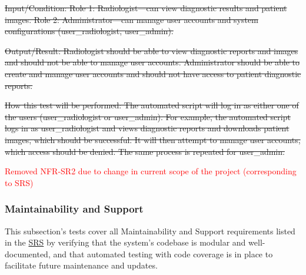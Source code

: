 \documentclass[12pt, titlepage]{article}
\begin{document}
\begin{enumerate}
\sout{Input/Condition: Role 1: Radiologist—can view diagnostic results and patient images. Role 2: Administrator—can manage user accounts and system configurations (user\_radiologist, user\_admin).}

\sout{Output/Result: Radiologist should be able to view diagnostic reports and images and should not be able to manage user accounts. Administrator should be able to create and manage user accounts and should not have access to patient diagnostic reports.}

\sout{How this test will be performed: The automated script will log in as either one of the users (user\_radiologist or user\_admin). For example, the automated script logs in as user\_radiologist and views diagnostic reports and downloads patient images, which should be successful. It will then attempt to manage user accounts, which access should be denied. The same process is repeated for user\_admin.}

\textcolor{red}{Removed NFR-SR2 due to change in current scope of the project (corresponding to SRS)}

\end{enumerate}

\subsubsection{Maintainability and Support}

This subsection's tests cover all Maintainability and Support requirements listed in the \href{https://github.com/RezaJodeiri/CXR-Capstone/blob/main/docs/SRS/SRS.pdf}{SRS} \citep{SRS}
 by verifying that the system's codebase is modular and well-documented, and that automated testing with code coverage is in place to facilitate future maintenance and updates.
\end{document}
